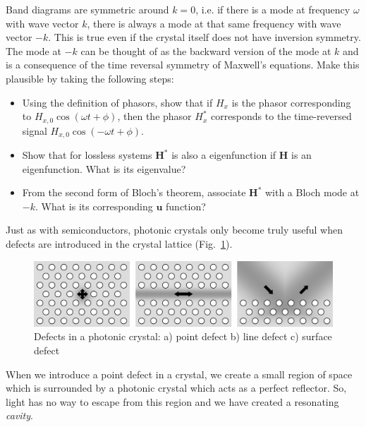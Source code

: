 \begin{exer}
Band diagrams are symmetric around $k=0$, i.e. if there is a mode at frequency $\omega$ with wave vector $k$, there is always a mode at that same frequency with wave vector $-k$. This is true even if the crystal itself does not have inversion symmetry. The mode at $-k$ can be thought of as the backward version of the mode at $k$ and is a consequence of the time reversal symmetry of Maxwell's equations. Make this plausible by taking the following steps:
\begin{itemize}
\item Using the definition of phasors, show that if $H_x$ is the phasor corresponding to $ H_{x,0} \cos \left( \omega t + \phi \right)$, then the phasor $H^*_x$ corresponds to the time-reversed signal $ H_{x,0} \cos \left(- \omega t + \phi  \right)$.
\item Show that for lossless systems ${\mathbf H}^*$ is also a eigenfunction if ${\mathbf H}$ is an eigenfunction. What is its eigenvalue?
\item From the second form of Bloch's theorem, associate ${\mathbf H}^*$ with a Bloch mode at $-k$. What is its corresponding ${\mathbf u}$ function?
\end{itemize}

\end{exer}

\pagebreak


Just as with semiconductors, photonic crystals only become truly useful when defects are introduced in the crystal lattice (Fig.~\ref{fig-defects}).

\begin{figure}
\centering
\includegraphics{symmetry/figures/2d_defects}
\caption{Defects in a photonic crystal: a) point defect b) line defect c) surface defect }
\label{fig-defects}
\end{figure}

When we introduce a point defect in a crystal, we create a small region of space which is surrounded by a photonic crystal which acts as a perfect reflector. So, light has no way to escape from this region and we have created a resonating \emph{cavity}.

